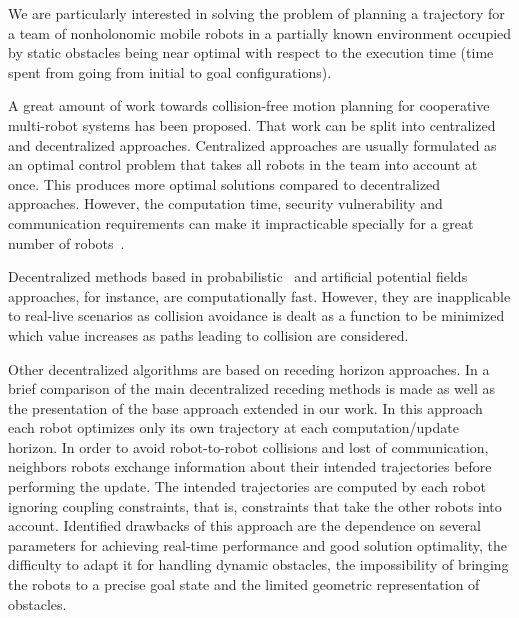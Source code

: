 \documentclass[eprint]{actapoly}
\begin{document}
We are particularly interested in solving the problem of planning a 
trajectory for a team of nonholonomic mobile robots in a partially known 
environment occupied by static obstacles being near optimal with respect to the 
execution time (time spent from going from initial to goal configurations).



A great amount of work towards collision-free motion 
planning for cooperative multi-robot systems has been proposed. That work can
be split into centralized and decentralized approaches.
Centralized approaches are usually formulated as an optimal
control problem that takes all robots in the team into account at once.
This produces more optimal solutions compared to decentralized approaches. However, the computation time, security vulnerability and communication 
requirements can make it impracticable specially for a great number of 
robots~\cite{Borrelli2006}.

Decentralized methods based in probabilistic~\cite{Sanchez2002} and artificial 
potential fields~\cite{Khatib1986} approaches, for instance, are computationally fast.
However, they are inapplicable to real-live scenarios as collision avoidance
is dealt as a function to be minimized which value increases as paths leading
to collision are considered.

Other decentralized algorithms are based on receding horizon approaches.
In \cite{Defoort2009} a brief comparison of the main decentralized receding 
methods is made as well as the presentation of the base approach extended in
our work.
In this approach each robot optimizes only its own 
trajectory at each computation/update horizon. In order to
avoid robot-to-robot collisions and lost of communication, neighbors robots 
exchange information about their intended trajectories before 
performing the update. The intended trajectories are computed by each robot
ignoring coupling constraints, that is, constraints that take the other robots 
into account.
Identified drawbacks of this approach are the dependence on 
several parameters for achieving real-time performance and good solution 
optimality, the difficulty to adapt it for handling dynamic obstacles, the 
impossibility of bringing the robots to a precise goal state and the limited
geometric representation of obstacles.
\end{document}
